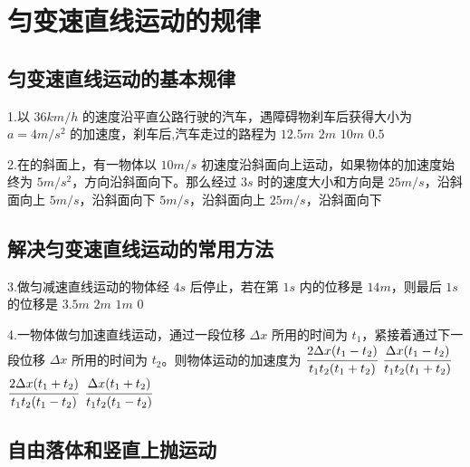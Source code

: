 \documentclass[a4paper,fontset = windows]{ctexbook} %
\begin{document}
\section{匀变速直线运动的规律}
\subsection{匀变速直线运动的基本规律}
\begin{xuanze}
   1.以 $36 km/h$ 的速度沿平直公路行驶的汽车，遇障碍物刹车后获得大小为 $a=4 m/s^2$ 的加速度，刹车后,汽车走过的路程为 
  \choice[A] $12.5 m$
  \choice[B] $2m$
  \choice[C] $10m$
  \choice[D] $0.5$

  2.在的斜面上，有一物体以 $10 m/s$ 初速度沿斜面向上运动，如果物体的加速度始终为 $5 m/s^2$，方向沿斜面向下。那么经过 $3 s$ 时的速度大小和方向是
\choice[A] $25 m/s$，沿斜面向上
\choice[B] $5 m/s$，沿斜面向下
\choice[C] $5 m/s$，沿斜面向上
\choice[D] $25 m/s$，沿斜面向下

\end{xuanze}

\subsection{解决匀变速直线运动的常用方法}

\begin{xuanze}
  3.做匀减速直线运动的物体经 $4s$ 后停止，若在第 $1s$ 内的位移是 $14m$，则最后 $1s$ 的位移是
\choice[A] $3.5m$
\choice[B] $2m$
\choice[C] $1m$
\choice[D] $0$
   
4.一物体做匀加速直线运动，通过一段位移 $\Delta x$ 所用的时间为 $t_1$，紧接着通过下一段位移 $\Delta x$ 所用的时间为 $t_2$。则物体运动的加速度为
\choice[A] $\cfrac{2\Delta x(t_1-t_2)}{t_1t_2(t_1+t_2)}$
\choice[B] $\cfrac{\Delta x(t_1-t_2)}{t_1t_2(t_1+t_2)}$
\choice[C] $\cfrac{2\Delta x(t_1+t_2)}{t_1t_2(t_1-t_2)}$
\choice[D] $\cfrac{\Delta x(t_1+t_2)}{t_1t_2(t_1-t_2)}$

\end{xuanze}

\subsection{自由落体和竖直上抛运动}
\end{document}
